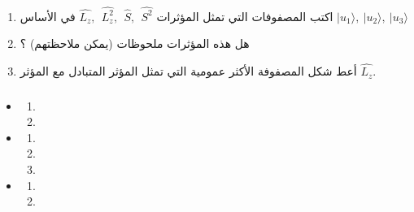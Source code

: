 \documentclass[a4paper,14pt]{article}
\begin{document}
	\begin{enumerate}
		
		\item  
اكتب المصفوفات التي تمثل المؤثرات $\hat{L_{z}},~~\hat{L^{2}_{z}},~~\hat{S},~~\hat{S^{2}}$ في الأساس $|u_{1}\rangle,~|u_{2}\rangle,~	|u_{3}\rangle $ 

		\item هل هذه المؤثرات ملحوظات (يمكن ملاحظتهم) ؟
		
		
		\item 
أعط شكل المصفوفة الأكثر عمومية التي تمثل المؤثر المتبادل مع المؤثر $\hat{L_{z}}$.
		
		
	\end{enumerate} 
	
\subsubsection*{}
	
\begin{itemize}
	\item 
	
	
	\begin{enumerate}
				
		\item 
	
		\item
	
				
		\end{enumerate}	
	\item
	
	
	\begin{enumerate}
		
		\item 
	
		\item
		
		\item
	
	\end{enumerate}	
\item

	\begin{enumerate}
	
	\item 

	\item
	
   \end{enumerate}	

\end{itemize}	

	
\end{document}
